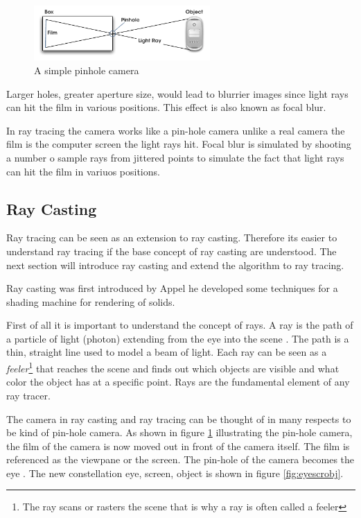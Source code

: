 \documentclass[DIV10, abstracton, openright, footsepline, headsepline, twoside, 9pt,
bigheadings]{scrreprt}
\begin{document}
\begin{figure}[H]
\centering
\includegraphics[width=0.6\textwidth]{bilder/pinhole}
\caption{A simple pinhole camera}
\label{fig:pinhole}
\end{figure}


Larger holes, greater aperture size, would lead to blurrier images since light
rays can hit the film in various positions. This effect is also known as focal
blur.

In ray tracing the camera works like a pin-hole camera unlike a real camera the
film is the computer screen the light rays hit. Focal blur is simulated by
shooting a number o sample rays from jittered points to simulate the fact that
light rays can hit the film in variuos positions.

\subsection{Ray Casting}
Ray tracing can be seen as an extension to ray casting. Therefore its easier to
understand ray tracing if the base concept of ray casting are understood. The
next section will introduce ray casting and extend the algorithm to ray tracing.

Ray casting was first introduced by Appel \cite{Appel68} he developed some
techniques for a shading machine for rendering of solids.

First of all it is important to understand the concept of rays. A ray is the
path of a particle of light (photon) extending from the eye into the
scene \cite{Glassner289}. The path is a thin, straight line used to model a beam
of light. Each ray can be seen as a \textit{feeler}\footnote{The ray scans or
rasters the scene that is why a ray is often called a feeler} that reaches the
scene and finds out which objects are visible and what color the object has at a
specific point. Rays are the fundamental element of any ray tracer.

The camera in ray casting and ray tracing can be thought of in many respects to
be kind of pin-hole camera. As shown in figure \ref{fig:pinhole} illustrating the
 pin-hole camera, the film of the camera is now moved out in front of the camera
itself.
The film is referenced as the viewpane or the screen. The pin-hole of the
camera becomes the eye \cite{Glassner89}. The new constellation eye, screen,
object is shown in  figure \ref{fig:eyescrobj}.
\end{document}
